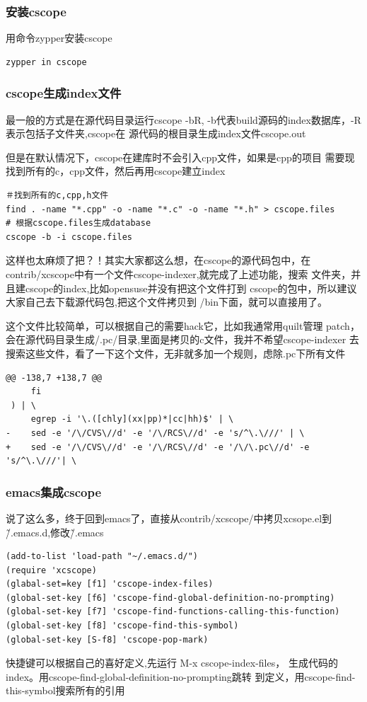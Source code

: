 \documentclass[adobefonts]{ctexart}
\begin{document}
\subsubsection{安装cscope}
用命令zypper安装cscope
\begin{verbatim}
zypper in cscope
\end{verbatim}
\subsubsection{cscope生成index文件}
最一般的方式是在源代码目录运行cscope -bR,
-b代表build源码的index数据库，-R表示包括子文件夹,cscope在
源代码的根目录生成index文件cscope.out

但是在默认情况下，cscope在建库时不会引入cpp文件，如果是cpp的项目
需要现找到所有的c，cpp文件，然后再用cscope建立index
\begin{verbatim}
＃找到所有的c,cpp,h文件
find . -name "*.cpp" -o -name "*.c" -o -name "*.h" > cscope.files
# 根据cscope.files生成database
cscope -b -i cscope.files
\end{verbatim}

这样也太麻烦了把？！其实大家都这么想，在cscope的源代码包中，在
contrib/xcscope中有一个文件cscope-indexer,就完成了上述功能，搜索
文件夹，并且建cscope的index,比如opensuse并没有把这个文件打到
cscope的包中，所以建议大家自己去下载源代码包,把这个文件拷贝到
/bin下面，就可以直接用了。

这个文件比较简单，可以根据自己的需要hack它，比如我通常用quilt管理
patch，会在源代码目录生成/.pc/目录,里面是拷贝的c文件，我并不希望cscope-indexer
去搜索这些文件，看了一下这个文件，无非就多加一个规则，虑除.pc下所有文件
\begin{verbatim}
@@ -138,7 +138,7 @@
     fi
 ) | \
     egrep -i '\.([chly](xx|pp)*|cc|hh)$' | \
-    sed -e '/\/CVS\//d' -e '/\/RCS\//d' -e 's/^\.\///' | \
+    sed -e '/\/CVS\//d' -e '/\/RCS\//d' -e '/\/\.pc\//d' -e 's/^\.\///'| \
\end{verbatim}
\subsubsection{emacs集成cscope}
说了这么多，终于回到emacs了，直接从contrib/xcscope/中拷贝xcsope.el到
\~/.emacs.d,修改\~/.emacs
\begin{verbatim}
(add-to-list 'load-path "~/.emacs.d/")
(require 'xcscope)
(glabal-set=key [f1] 'cscope-index-files)
(global-set-key [f6] 'cscope-find-global-definition-no-prompting)
(global-set-key [f7] 'cscope-find-functions-calling-this-function)
(global-set-key [f8] 'cscope-find-this-symbol)
(global-set-key [S-f8] 'cscope-pop-mark)
\end{verbatim}
快捷键可以根据自己的喜好定义,先运行 M-x cscope-index-files，
生成代码的index。用cscope-find-global-definition-no-prompting跳转
到定义，用cscope-find-this-symbol搜索所有的引用
\end{document}

